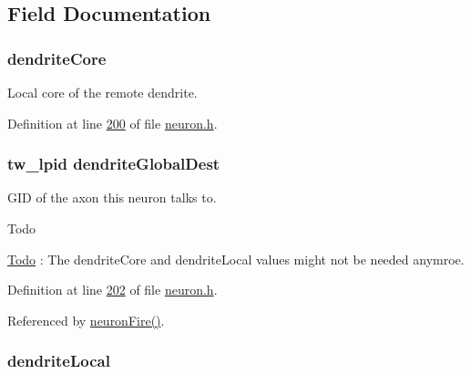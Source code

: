 \subsection{Field Documentation}
\hypertarget{structneuron_state_a62463fa4d33c39297aa5ce3a145d474f}{}
\subsubsection[{dendrite\+Core}]{ dendrite\+Core}\label{structneuron_state_a62463fa4d33c39297aa5ce3a145d474f}


Local core of the remote dendrite. 



Definition at line \hyperlink{neuron_8h_source_l00200}{200} of file \hyperlink{neuron_8h_source}{neuron.\+h}.

\hypertarget{structneuron_state_a4199c14c5aabfd52f441e01623bdc84c}{}
\subsubsection[{dendrite\+Global\+Dest}]{\setlength{\rightskip}{0pt plus 5cm}tw\+\_\+lpid dendrite\+Global\+Dest}\label{structneuron_state_a4199c14c5aabfd52f441e01623bdc84c}


G\+I\+D of the axon this neuron talks to. 

\begin{DoxyRefDesc}{Todo}
\item[\hyperlink{todo__todo000009}{Todo}]\+: The dendrite\+Core and dendrite\+Local values might not be needed anymroe. \end{DoxyRefDesc}


Definition at line \hyperlink{neuron_8h_source_l00202}{202} of file \hyperlink{neuron_8h_source}{neuron.\+h}.



Referenced by \hyperlink{neuron_8c_source_l00167}{neuron\+Fire()}.

\hypertarget{structneuron_state_a73e5b16411af572181411b8fd8d5117d}{}
\subsubsection[{dendrite\+Local}]{ dendrite\+Local}\label{structneuron_state_a73e5b16411af572181411b8fd8d5117d}


